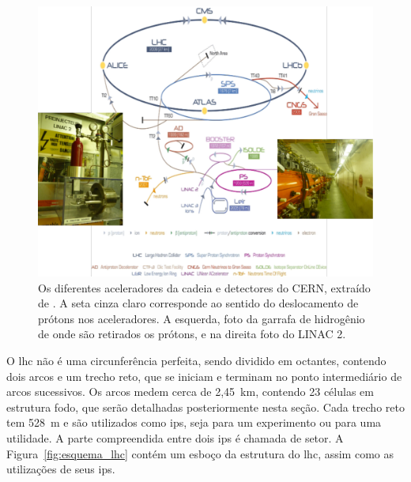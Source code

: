 \begin{figure}[h!t]
\centering
\includegraphics[width=\textwidth]{imagens/lhc_garrafa_linac2.pdf}
\caption[A cadeia de aceleração do LHC]{
Os diferentes aceleradores da cadeia e detectores do CERN, extraído de
\cite{cern_accelerators}. A seta cinza claro corresponde ao sentido do
deslocamento de prótons nos aceleradores. A esquerda, foto da garrafa
de hidrogênio de onde são retirados os prótons, e na direita foto do LINAC 2.}
\label{fig:esquema_aceleradores}
\end{figure}

O \gls{lhc} não é uma circunferência perfeita, sendo dividido em octantes, 
contendo dois arcos e um trecho reto, que se iniciam e terminam no ponto
intermediário de arcos sucessivos. Os arcos medem cerca de 2,45~km,
contendo 23 células em estrutura \gls{fodo}, que serão detalhadas
posteriormente nesta seção. 
Cada trecho reto tem 528~m e são utilizados como \glspl{ip},
seja para um experimento ou para uma utilidade. A parte
compreendida entre dois \glspl{ip} é chamada de setor. A 
Figura~\ref{fig:esquema_lhc} contém um esboço da estrutura do \gls{lhc}, assim
como as utilizações de seus \glspl{ip}.

